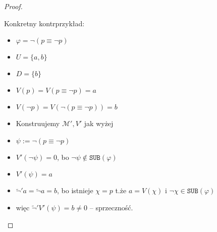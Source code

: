 \documentclass{article}
\theoremstyle{definition}
\theoremstyle{definition}
\newcommand*{\id}{\equiv}
\newcommand*{\SUB}{\texttt{SUB}}
\newcommand{\M}{\mathcal{M}\xspace}
\begin{document}
\begin{proof}
\begin{itemize}
\begin{enumerate}
{                              Konkretny kontrprzykład:
                              \begin{itemize}
                                  \item $\varphi = \lnot(p \id \lnot p)$
                                  \item $U = \{a, b\}$
                                  \item $D = \{b\}$
                                  \item $V(p) = V(p \id \lnot p) = a$
                                  \item $V(\lnot p) = V(\lnot(p \id \lnot p)) = b$
                                  \item Konstruujemy $\M',V'$ jak wyżej
                                  \item $\psi := \lnot(p \id \lnot p)$
                                  \item $V'(\lnot \psi) = 0$, bo $\lnot \psi \not \in \SUB(\varphi)$
                                  \item $V'(\psi) = a$
                                  \item $\tilde{\lnot}'a = \tilde{\lnot}a = b$, bo istnieje $\chi = p$ t.że $a=V(\chi)$ i $\lnot \chi \in \SUB(\varphi)$
                                  \item więc $\tilde{\lnot}'V'(\psi) = b \not = 0$ -- sprzeczność.
                              \end{itemize}

}
\end{enumerate}
\end{itemize}
\end{proof}
\end{document}
